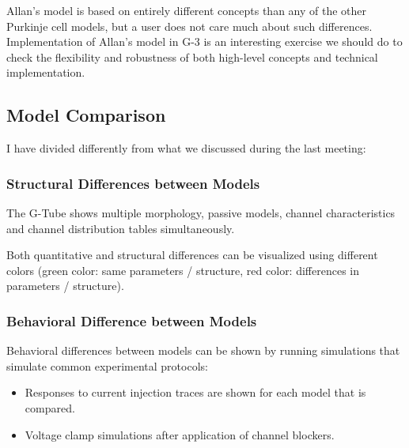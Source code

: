 \documentclass[12pt]{article}
\begin{document}
Allan's model is based on entirely different concepts than any of the
other Purkinje cell models, but a user does not care much about such
differences.  Implementation of Allan's model in G-3 is an interesting
exercise we should do to check the flexibility and robustness of both
high-level concepts and technical implementation.


\subsection{Model Comparison}

I have divided differently from what we discussed during the last
meeting:

\subsubsection{Structural Differences between Models}

The G-Tube shows multiple morphology, passive models, channel
characteristics and channel distribution tables simultaneously.

Both quantitative and structural differences can be visualized using
different colors (green color: same parameters / structure, red color:
differences in parameters / structure).

\subsubsection{Behavioral Difference between Models}

Behavioral differences between models can be shown by running
simulations that simulate common experimental protocols:

\begin{itemize}
\item Responses to current injection traces are shown for each model
  that is compared.
\item Voltage clamp simulations after application of channel blockers.
\end{itemize}
\end{document}
